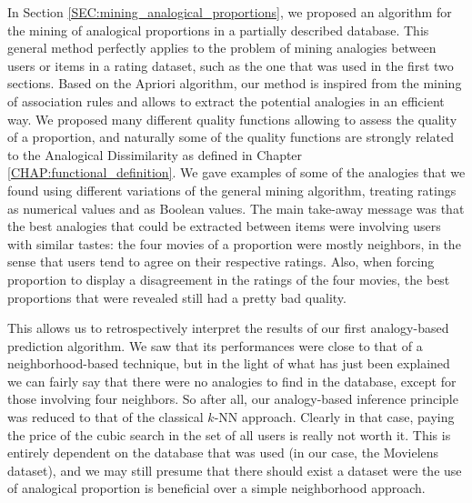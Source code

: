 In Section \ref{SEC:mining_analogical_proportions}, we proposed an algorithm for the mining of analogical
proportions in a partially described database. This general method perfectly
applies to the problem of mining analogies between users or items in a rating
dataset, such as the one that was used in the first two sections. Based on the
Apriori algorithm, our method is inspired from the mining of association rules
and allows to extract the potential analogies in an efficient way.
We proposed many different quality functions allowing to assess the quality of
a proportion, and naturally some of the quality functions are strongly related
to the Analogical Dissimilarity as defined in Chapter
\ref{CHAP:functional_definition}. We gave
examples of some of the analogies that we found using different variations of
the general mining algorithm, treating ratings as numerical values and as
Boolean values. The main take-away message was that the best analogies that
could be extracted between items were involving users with similar tastes: the four movies of a
proportion were mostly neighbors, in the sense that users tend to agree on
their respective ratings. Also, when forcing proportion to display a
disagreement in the ratings of the four movies, the best proportions that were
revealed still had a pretty bad quality.

This allows us to retrospectively interpret the results of our first
analogy-based prediction algorithm. We saw that its performances were close to
that of a neighborhood-based technique, but in the light of what has just been
explained we can fairly say that there were no analogies to find in the
database, except for those involving four neighbors. So after all, our
analogy-based inference principle was reduced to that of the classical $k$-NN
approach. Clearly in that case, paying the price of the cubic search in the set
of all users is really not worth it. This is entirely dependent on the database
that was used (in our case, the Movielens dataset), and we may still presume
that there should exist a dataset were the use of analogical proportion is
beneficial over a simple neighborhood approach.
